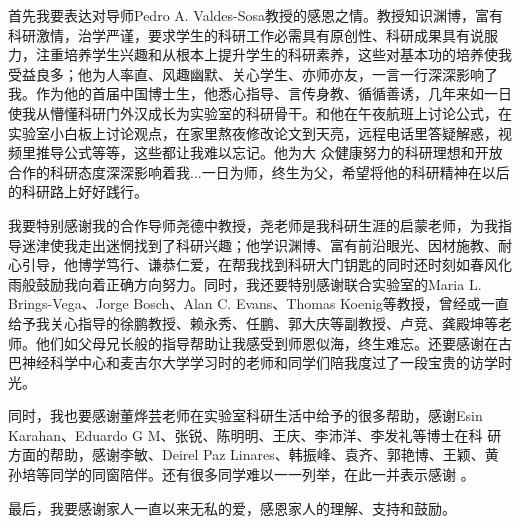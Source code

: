 \thesisacknowledgement
首先我要表达对导师Pedro A. Valdes-Sosa教授的感恩之情。教授知识渊博，富有科研激情，治学严谨，要求学生的科研工作必需具有原创性、科研成果具有说服力，注重培养学生兴趣和从根本上提升学生的科研素养，这些对基本功的培养使我受益良多；他为人率直、风趣幽默、关心学生、亦师亦友，一言一行深深影响了我。作为他的首届中国博士生，他悉心指导、言传身教、循循善诱，几年来如一日使我从懵懂科研门外汉成长为实验室的科研骨干。和他在午夜航班上讨论公式，在实验室小白板上讨论观点，在家里熬夜修改论文到天亮，远程电话里答疑解惑，视频里推导公式等等，这些都让我难以忘记。他为大
众健康努力的科研理想和开放合作的科研态度深深影响着我...一日为师，终生为父，希望将他的科研精神在以后的科研路上好好践行。

我要特别感谢我的合作导师尧德中教授，尧老师是我科研生涯的启蒙老师，为我指导迷津使我走出迷惘找到了科研兴趣；他学识渊博、富有前沿眼光、因材施教、耐心引导，他博学笃行、谦恭仁爱，在帮我找到科研大门钥匙的同时还时刻如春风化雨般鼓励我向着正确方向努力。同时，我还要特别感谢联合实验室的Maria L. Brings-Vega、Jorge Bosch、Alan C. Evans、Thomas Koenig等教授，曾经或一直给予我关心指导的徐鹏教授、赖永秀、任鹏、郭大庆等副教授、卢竞、龚殿坤等老师。他们如父母兄长般的指导帮助让我感受到师恩似海，终生难忘。还要感谢在古巴神经科学中心和麦吉尔大学学习时的老师和同学们陪我度过了一段宝贵的访学时光。

同时，我也要感谢董烨芸老师在实验室科研生活中给予的很多帮助，感谢Esin Karahan、Eduardo G M、张锐、陈明明、王庆、李沛洋、李发礼等博士在科
研方面的帮助，感谢李敏、Deirel Paz Linares、韩振峰、袁齐、郭艳博、王颖、黄孙培等同学的同窗陪伴。还有很多同学难以一一列举，在此一并表示感谢
。

最后，我要感谢家人一直以来无私的爱，感恩家人的理解、支持和鼓励。